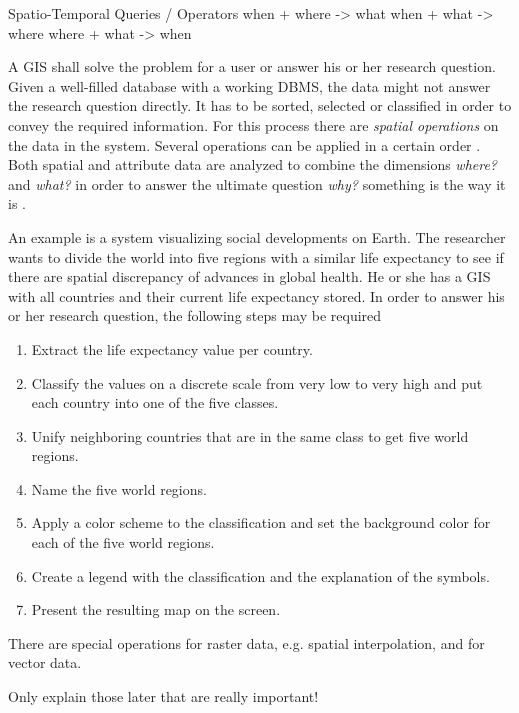 Spatio-Temporal Queries / Operators
  when + where -> what
  when + what -> where
  where + what -> when


A GIS shall solve the problem for a user or answer his or her research question. Given a well-filled database with a working DBMS, the data might not answer the research question directly. It has to be sorted, selected or classified in order to convey the required information. For this process there are \emph{spatial operations} on the data in the system. Several operations can be applied in a certain order
\cite[pp. 321-325]{bolstad2008gis}.
Both spatial and attribute data are analyzed to combine the dimensions \emph{where?} and \emph{what?} in order to answer the ultimate question \emph{why?} something is the way it is
\cite[p.xii-xvi]{knowles2002past}.

An example is a system visualizing social developments on Earth. The researcher wants to divide the world into five regions with a similar life expectancy to see if there are spatial discrepancy of advances in global health. He or she has a GIS with all countries and their current life expectancy stored. In order to answer his or her research question, the following steps may be required

\begin{enumerate}
  \item Extract the life expectancy value per country.
  \item Classify the values on a discrete scale from very low to very high and put each country into one of the five classes.
  \item Unify neighboring countries that are in the same class to get five world regions.
  \item Name the five world regions.
  \item Apply a color scheme to the classification and set the background color for each of the five world regions.
  \item Create a legend with the classification and the explanation of the symbols.
  \item Present the resulting map on the screen.
\end{enumerate}

There are special operations for raster data, e.g. spatial interpolation, and for vector data.

Only explain those later that are really important!

